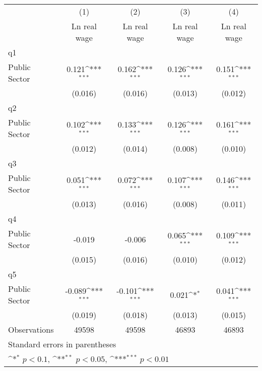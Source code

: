 {
\def\sym#1{\ifmmode^{#1}\else\(^{#1}\)\fi}
\begin{tabular}{l*{4}{c}}
\hline\hline
                    &\multicolumn{1}{c}{(1)}&\multicolumn{1}{c}{(2)}&\multicolumn{1}{c}{(3)}&\multicolumn{1}{c}{(4)}\\
                    &\multicolumn{1}{c}{Ln real wage}&\multicolumn{1}{c}{Ln real wage}&\multicolumn{1}{c}{Ln real wage}&\multicolumn{1}{c}{Ln real wage}\\
\hline
q1                  &                     &                     &                     &                     \\
Public Sector       &       0.121\sym{***}&       0.162\sym{***}&       0.126\sym{***}&       0.151\sym{***}\\
                    &     (0.016)         &     (0.016)         &     (0.013)         &     (0.012)         \\
\hline
q2                  &                     &                     &                     &                     \\
Public Sector       &       0.102\sym{***}&       0.133\sym{***}&       0.126\sym{***}&       0.161\sym{***}\\
                    &     (0.012)         &     (0.014)         &     (0.008)         &     (0.010)         \\
\hline
q3                  &                     &                     &                     &                     \\
Public Sector       &       0.051\sym{***}&       0.072\sym{***}&       0.107\sym{***}&       0.146\sym{***}\\
                    &     (0.013)         &     (0.016)         &     (0.008)         &     (0.011)         \\
\hline
q4                  &                     &                     &                     &                     \\
Public Sector       &      -0.019         &      -0.006         &       0.065\sym{***}&       0.109\sym{***}\\
                    &     (0.015)         &     (0.016)         &     (0.010)         &     (0.012)         \\
\hline
q5                  &                     &                     &                     &                     \\
Public Sector       &      -0.089\sym{***}&      -0.101\sym{***}&       0.021\sym{*}  &       0.041\sym{***}\\
                    &     (0.019)         &     (0.018)         &     (0.013)         &     (0.015)         \\
\hline
Observations        &       49598         &       49598         &       46893         &       46893         \\
\hline\hline
\multicolumn{5}{l}{\footnotesize Standard errors in parentheses}\\
\multicolumn{5}{l}{\footnotesize \sym{*} \(p<0.1\), \sym{**} \(p<0.05\), \sym{***} \(p<0.01\)}\\
\end{tabular}
}
